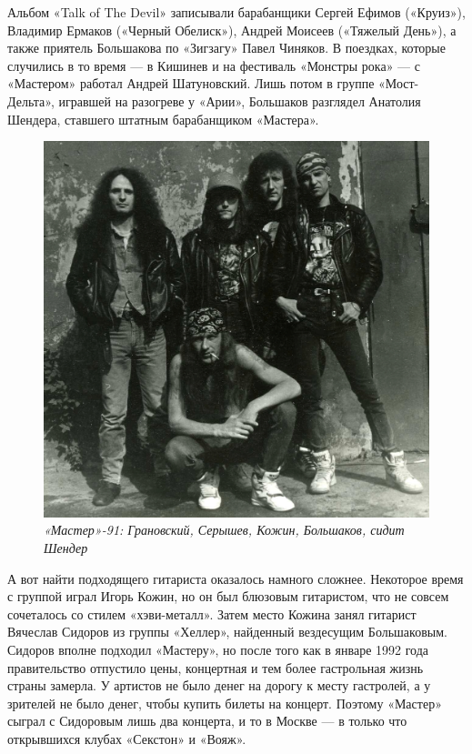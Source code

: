 \documentclass[16pt,a5paper,oneside]{book}
\begin{document}
Альбом «Talk of The Devil» записывали барабанщики Сергей Ефимов («Круиз»), Владимир Ермаков («Черный Обелиск»), Андрей
Моисеев («Тяжелый День»), а также приятель Большакова по «Зигзагу» Павел Чиняков. В поездках, которые случились в то
время — в Кишинев и на фестиваль «Монстры рока» — с «Мастером» работал Андрей Шатуновский. Лишь потом в группе
«Мост-Дельта», игравшей на разогреве у «Арии», Большаков разглядел Анатолия Шендера, ставшего штатным барабанщиком
«Мастера».

\begin{figure}
    \centering
    \includegraphics[scale=0.8]{Image28}
    \caption{\textit{«Мастер»-91: Грановский, Серышев, Кожин, Большаков, сидит Шендер}}
\end{figure}

А вот найти подходящего гитариста оказалось намного сложнее. Некоторое время с группой играл Игорь Кожин, но он был
блюзовым гитаристом, что не совсем сочеталось со стилем «хэви-металл». Затем место Кожина занял гитарист Вячеслав
Сидоров из группы «Хеллер», найденный вездесущим Большаковым. Сидоров вполне подходил «Мастеру», но после того как в
январе 1992 года правительство отпустило цены, концертная и тем более гастрольная жизнь страны замерла. У артистов не
было денег на дорогу к месту гастролей, а у зрителей не было денег, чтобы купить билеты на концерт. Поэтому «Мастер»
сыграл с Сидоровым лишь два концерта, и то в Москве — в только что открывшихся клубах «Секстон» и «Вояж».
\end{document}
